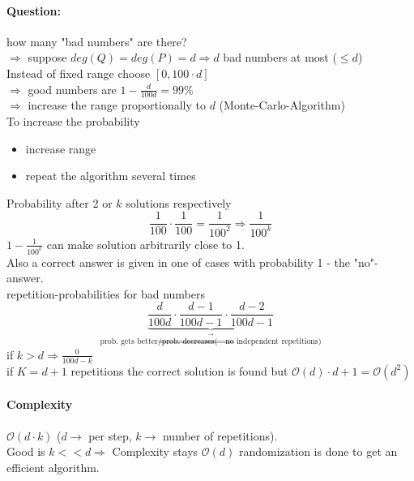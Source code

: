\paragraph{Question:} how many "bad numbers" are there? \\
$\Rightarrow$ suppose $deg(Q) = deg(P) = d \Rightarrow d $ bad numbers at most ($\leq d$) \\
Instead of fixed range choose $[0,100 \cdot d]$ \\
$\Rightarrow$ good numbers are $1 - \frac{d}{100d} = 99\%$\\
$\Rightarrow $ increase the range proportionally to $d$ (Monte-Carlo-Algorithm) \\
To increase the probability \\
\begin{itemize}
	\item increase range
	\item repeat the algorithm several times
\end{itemize}
Probability after 2 or $k$ solutions respectively 
$$\frac{1}{100} \cdot \frac{1}{100} = \frac{1}{100^2} \Rightarrow \frac{1	}{100^k}$$
$1-\frac{1}{100^k}$ can make solution arbitrarily close to 1. \\
Also a correct answer is given in one of cases with probability 1 - the "no"-answer. \\
repetition-probabilities for bad numbers
$$\underbrace{\frac{d}{100d} \cdot \frac{d-1}{100d-1} \cdot \frac{d-2}{100d-1}}_{\stackrel{\rightarrow}{\text{prob. gets better/prob. decreases(}\Rightarrow\text{no independent repetitions)}}}$$
if $k>d \Rightarrow \frac{0}{100d-k}$ \\
if $K=d+1$ repetitions the correct solution is found but $\mathcal{O}(d) \cdot d+1 = \mathcal{O}(d^2)$ \\
\paragraph{Complexity} $\mathcal{O}(d\cdot k)$ ($d \rightarrow$ per step, $k \rightarrow$ number of repetitions). \\
Good is $k<<d \Rightarrow$ Complexity stays $\mathcal{O}(d)$ randomization is done to get an efficient algorithm. 
